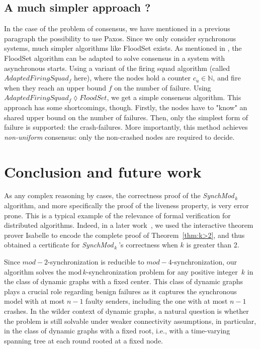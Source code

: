 \documentclass[11pt,letterpaper]{article}
\newcommand{\SM}{{\em SynchMod}$_{\,k}\ $}
\begin{document}
\subsection{A much simpler approach ?}

In the case of the problem of consensus, we have mentioned in a previous paragraph the possibility to use Paxos.
Since we only consider synchronous systems, much simpler algorithms like FloodSet \cite{Lyn96} exists.
As mentioned in \cite{CDDS85}, the FloodSet algorithm can be adapted to solve consensus in a system with asynchronous starts.
Using a variant of the firing squad algorithm (called $AdaptedFiringSquad_f$ here),
where the nodes hold a counter $c_u \in \mathds{N}$, and fire when they reach an upper bound $f$ on the number of failure.
Using $AdaptedFiringSquad_f \lozenge FloodSet$, we get a simple consensus algorithm.
This approach has some shortcomings, though.
Firstly, the nodes have to "know" an shared upper bound on the number of failures.
Then, only the simplest form of failure is supported: the crash-failures.
More importantly, this method achieves \textit{non-uniform} consensus: only the non-crashed nodes are required to decide.

\section{Conclusion and future work}

As any complex reasoning by cases, the correctness proof  of the \SM   algorithm, 
	and more specifically the proof of the liveness property, is very error prone. 
This is a typical example of the relevance of formal verification for distributed algorithms. 
Indeed, in a later work~\cite{}, we used the interactive theorem prover Isabelle \cite{Merz12} to encode the complete proof 
	of Theorem~\ref{thm:k>2}, and thus obtained a certificate for  \SM\!\!'s correctness when $k$ is greater than 2.
	
Since $mod-2$-synchronization is reducible to $mod-4$-synchronization,
	 our algorithm solves the $\mathrm{mod}\,k$-synchronization problem for any positive integer~$k$
	 in the class of  dynamic  graphs with a fixed center.
This class of dynamic graphs plays a crucial role regarding benign failures as it captures 
	the synchronous model with at most $n-1$ faulty senders, including the one with at most $n-1$ crashes.
In the wilder context of dynamic graphs, a natural question is whether the problem is still solvable 
	under weaker connectivity assumptions, in particular, in the class of dynamic graphs with a fixed root, 
	i.e., with a time-varying spanning tree at each round rooted at a fixed node.


\printbibliography
\end{document}

